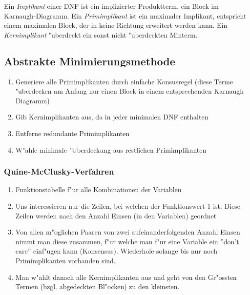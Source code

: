 \documentclass[german, 10pt, a4paper, twocolumn]{scrartcl}
\theoremstyle{definition}
\begin{document}
Ein \textit{Implikant} einer DNF ist ein implizierter Produktterm, ein Block im Karnaugh-Diagramm. Ein \textit{Primimplikant} ist ein maximaler Implikant, entspricht einem maximalen Block, der in keine Richtung erweitert werden kann. Ein \textit{Kernimplikant} "uberdeckt ein sonst nicht "uberdeckten Minterm.

\subsection{Abstrakte Minimierungsmethode}

\begin{enumerate}
	\item Generiere alle Primimplikanten durch einfache Konsusregel (diese Terme "uberdecken am Anfang nur einen Block in einem entsprechenden Karnaugh Diagramm)
	\item Gib Kernimplikanten aus, da in jeder minimalen DNF enthalten
	\item Entferne redundante Primimplikanten
	\item W"ahle minimale "Uberdeckung aus restlichen Primimplikanten
\end{enumerate}

\subsubsection{Quine-McClusky-Verfahren}

\begin{enumerate}
	\item Funktionstabelle f"ur alle Kombinationen der Variablen
	\item Uns interessieren nur die Zeilen, bei welchen der Funktionswert 1 ist. Diese Zeilen werden nach den Anzahl Einsen (in den Variablen) geordnet
	\item Von allen m"oglichen Paaren von zwei aufeinanderfolgenden Anzahl Einsen nimmt man diese zusammen, f"ur welche man f"ur eine Variable ein ''don't care'' einf"ugen kann (Konsensus). Wiederhole solange bis nur noch Primimplikanten vorhanden sind.
	\item Man w"ahlt danach alle Kernimplikanten aus und geht von den Gr"ossten Termen (bzgl. abgedeckten Bl"ocken) zu den kleinsten.
\end{enumerate}
\end{document}
